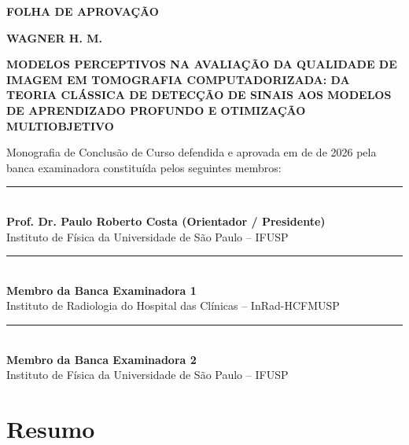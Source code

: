 \documentclass[
  12pt,
  a4paper,
  oneside
]{report}
\newcommand{\tccautor}{WAGNER H. M.}
\newcommand{\tcctitulo}{MODELOS PERCEPTIVOS NA AVALIAÇÃO DA QUALIDADE DE IMAGEM EM TOMOGRAFIA COMPUTADORIZADA: DA TEORIA CLÁSSICA DE DETECÇÃO DE SINAIS AOS MODELOS DE APRENDIZADO PROFUNDO E OTIMIZAÇÃO MULTIOBJETIVO}
\newcommand{\tccorientador}{Prof. Dr. Paulo Roberto Costa}
\newcommand{\tccano}{2026}
\begin{document}
\begin{center}
  {\bfseries\Large FOLHA DE APROVAÇÃO \par}
  
  \vspace{1.5cm}
  
  {\bfseries\large \tccautor \par}
  
  \vspace{0.8cm}
  
  {\bfseries \tcctitulo \par}

  \vspace{1.5cm}

  \begin{flushright}
    \begin{minipage}{0.55\textwidth}
      \small
      Monografia de Conclusão de Curso defendida e aprovada em \underline{\hspace{1cm}} de \underline{\hspace{3.5cm}} de \tccano{} pela banca examinadora constituída pelos seguintes membros:
    \end{minipage}
  \end{flushright}

  \vspace{1.8cm}

  \rule{0.85\textwidth}{0.5pt}\\
  \textbf{\tccorientador{} (Orientador / Presidente)}\\
  Instituto de Física da Universidade de São Paulo -- IFUSP

  \vspace{1.2cm}

  \rule{0.85\textwidth}{0.5pt}\\
  \textbf{Membro da Banca Examinadora 1}\\
  Instituto de Radiologia do Hospital das Clínicas -- InRad-HCFMUSP

  \vspace{1.2cm}

  \rule{0.85\textwidth}{0.5pt}\\
  \textbf{Membro da Banca Examinadora 2}\\
  Instituto de Física da Universidade de São Paulo -- IFUSP
\end{center}
\clearpage

\chapter*{Resumo}
\end{document}
